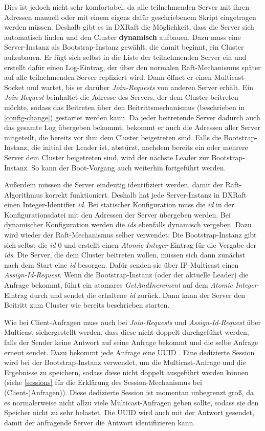 Dies ist jedoch nicht sehr komfortabel, da alle teilnehmenden Server mit ihren Adressen manuell oder mit einem eigens dafür geschriebenem Skript eingetragen werden müssen. Deshalb gibt es in DXRaft die Möglichkeit, dass die Server sich automatisch finden und den Cluster \textbf{dynamisch} aufbauen. Dazu muss eine Server-Instanz als Bootstrap-Instanz gewählt, die damit beginnt, ein Cluster aufzubauen. Er fügt sich selbst in die Liste der teilnehmenden Server ein und erstellt dafür einen Log-Eintrag, der über den normalen Raft-Mechanismus später auf alle teilnehmenden Server repliziert wird. Dann öffnet er einen Multicast-Socket und wartet, bis er darüber \textit{Join-Requests} von anderen Server erhält. Ein \textit{Join-Request} beinhaltet die Adresse des Servers, der dem Cluster beitreten möchte, sodass das Beitreten über den Beitrittsmechanismus (beschrieben in \ref{config-change}) gestartet werden kann. Da jeder beitretende Server dadurch auch das gesamte Log übergeben bekommt, bekommt er auch die Adressen aller Server mitgeteilt, die bereits vor ihm dem Cluster beigetreten sind. Falls die Bootstrap-Instanz, die initial der Leader ist, abstürzt, nachdem bereits ein oder mehrere Server dem Cluster beigetreten sind, wird der nächste Leader zur Bootstrap-Instanz. So kann der Boot-Vorgang auch weiterhin fortgeführt werden.

Außerdem müssen die Server eindeutig identifiziert werden, damit der Raft-Algorithmus korrekt funktioniert. Deshalb hat jede Server-Instanz in DXRaft einen Integer-Identifier \textit{id}. Bei statischer Konfiguration muss die \textit{id} in der Konfigurationsdatei mit den Adressen der Server übergeben werden. Bei dynamischer Konfiguration werden die \textit{ids} ebenfalls dynamisch vergeben. Dazu wird wieder der Raft-Mechanismus selber verwendet: Die Bootstrap-Instanz gibt sich selbst die \textit{id} 0 und erstellt einen \textit{Atomic Integer}-Eintrag für die Vergabe der \textit{ids}. Die Server, die dem Cluster beitreten wollen, müssen sich dann zunächst nach dem Start eine \textit{id} besorgen. Dafür senden sie über IP-Multicast einen \textit{Assign-Id-Request}. Wenn die Bootstrap-Instanz (oder der aktuelle Leader) die Anfrage bekommt, führt ein atomares \textit{GetAndIncrement} auf dem \textit{Atomic Integer}-Eintrag durch und sendet die erhaltene \textit{id} zurück. Dann kann der Server den Beitritt zum Cluster wie bereits beschrieben starten.

Wie bei Client-Anfragen muss auch bei \textit{Join-Requests} und \textit{Assign-Id-Request} über Multicast sichergestellt werden, dass diese nicht doppelt durchgeführt werden, falls der Sender keine Antwort auf seine Anfrage bekommt und die selbe Anfrage erneut sendet. Dazu bekommt jede Anfrage eine UUID \cite{uuid}. Eine dedizierte Session wird bei der Bootstrap-Instanz verwendet, um die Multicast-Anfrage und die Ergebnisse zu speichern, sodass diese nicht doppelt ausgeführt werden können (siehe \ref{sessions} für die Erklärung des Session-Mechanismus bei (Client-)Anfragen)). Diese dedizierte Session ist momentan unbegrenzt groß, da es normalerweise nicht allzu viele Multicast-Anfragen geben sollte, sodass sie den Speicher nicht zu sehr belastet. Die UUID wird auch mit der Antwort gesendet, damit der anfragende Server die Antwort identifizieren kann.

